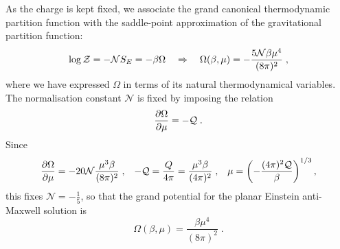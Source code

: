 As the charge is kept fixed, we associate the grand canonical thermodynamic partition function with the saddle-point approximation of the gravitational partition function:
\begin{equation*}
    \log \mathcal{Z} = -{\cal N} S_E = - \beta \Omega \quad \Rightarrow \quad \Omega(\beta, \mu) = - \frac{5 \mathcal{N} \beta \mu^4 }{(8 \pi)^2}\;,
\end{equation*}
where we have expressed $\Omega$ in terms of its natural thermodynamical variables. 
The normalisation constant $\mathcal{N}$ is fixed by imposing the relation
\begin{equation*}
    \frac{\partial \Omega}{\partial \mu} = -\mathcal{Q} \;.
\end{equation*}
Since
\[
\frac{\partial \Omega}{\partial \mu} = - 20 \mathcal{N}  \frac{\mu^3 \beta}{(8\pi)^2} \;,\;\;\;
- \mathcal{Q} = \frac{Q}{4\pi} = \frac{\mu^3 \beta}{(4 \pi)^2} \;, \;\;\;
\mu = \left( - \frac{(4\pi)^2 \mathcal{Q}}{\beta} \right)^{1/3},
\] 
this fixes $\mathcal{N}=-\frac{1}{5}$, so that the grand potential for the 
planar Einstein anti-Maxwell solution is
\[
\Omega(\beta, \mu) = \frac{\beta \mu^4}{(8\pi)^2} \;.
\]

